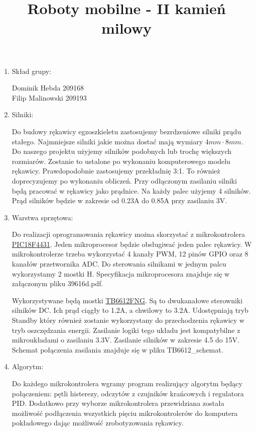 \documentclass[a4paper]{article}
\author{}
\title{Roboty mobilne - II kamień milowy}
\date{}
\begin{document}
\maketitle

\begin{enumerate}

\item Skład grupy:

Dominik Hebda 209168 \\
Filip Malinowski 209193

\item Silniki:

Do budowy rękawicy egzoszkieletu zastosujemy bezrdzeniowe silniki prądu stałego. Najmniejsze silniki jakie można dostać mają wymiary
\begin{math}
4mm \cdot 8mm.
\end{math}
Do naszego projektu użyjemy silników podobnych lub trochę większych rozmiarów. Zostanie to ustalone po wykonaniu komputerowego modelu rękawicy. Prawdopodobnie zastosujemy przekładnię 3:1. To również doprecyzujemy po wykonaniu obliczeń. Przy odłączonym zasilaniu silniki będą pracować w rękawicy jako prądnice. Na każdy palec użyjemy 4 silników. Prąd silników będzie w zakresie od 0.23A do 0.85A przy zasilaniu 3V.

\item Warstwa sprzętowa:

Do realizacji oprogramowania rękawicy można skorzystać z mikrokontrolera
\href{http://www.microchip.com/wwwproducts/en/PIC18F4431}{PIC18F4431}.
Jeden mikroprocesor będzie obsługiwać jeden palec rękawicy. W mikrokontrolerze trzeba wykorzystać 4 kanały PWM, 12 pinów GPIO oraz 8 kanałów przetwornika ADC. Do sterowania silnikami w jednym palcu wykorzystamy 2 mostki H. Specyfikacja mikroprocesora znajduje się w załączonym pliku 39616d.pdf.

Wykorzystywane będą mostki 
\href{https://www.sparkfun.com/datasheets/Robotics/TB6612FNG.pdf}{TB6612FNG}. Są to dwukanałowe sterowniki silników DC. Ich prąd ciągły to 1.2A, a chwilowy to 3.2A. Udostępniają tryb Standby który również zostanie wykorzystany do przechodzenia rękawicy w tryb oszczędzania energii. Zasilanie logiki tego układu jest kompatybilne z mikroukładami o zasilaniu 3.3V. Zasilanie silników w zakresie 4.5 do 15V. Schemat połączenia zasilania znajduje się w pliku TB6612\_schemat.


\item Algorytm:

Do każdego mikrokontrolera wgramy program realizujący algorytm będący połączeniem: pętli histerezy, odczytów z czujników krańcowych i regulatora PID. Dodatkowo przy wyborze mikrokontrolera przewidziana została możliwość podłączenia wszystkich pięciu mikrokontrolerów do komputera pokładowego dając możliwość zrobotyzowania rękawicy.


\end{enumerate}
\end{document}
